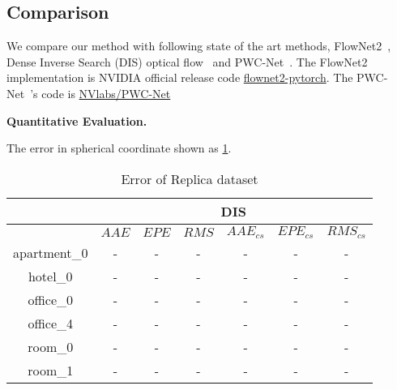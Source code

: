 \subsection{Comparison}

We compare our method with following state of the art methods, FlowNet2~\cite{IlgMSKDB2017}, Dense Inverse Search (DIS) optical flow~\cite{KroegTDV2016} and PWC-Net~\cite{SunYLK2018}. 
The FlowNet2~\cite{IlgMSKDB2017} implementation is NVIDIA official release code \href{https://github.com/NVIDIA/flownet2-pytorch}{flownet2-pytorch}.
The PWC-Net~\cite{SunYLK2018}'s code is \href{https://github.com/NVlabs/PWC-Net}{NVlabs/PWC-Net}


\textbf{Quantitative Evaluation.}


The error in spherical coordinate shown as \cref{fig:exp:quality}.



\begin{table}[h!]
	\centering
	\begin{tabular}{ c | c | c | c | c | c | c }
		\hline
		& \multicolumn{6}{c}{DIS}  \\
		\hline
		& ${AAE}$ & ${EPE}$ & ${RMS}$ & ${AAE_{cs}}$ & ${EPE_{cs}}$ & ${RMS_{cs}}$ \\
		\hline
		apartment\_0 & - & - & -  & - & - & -  \\ 
		\hline
		hotel\_0 & - & - & -  & - & - & -  \\ 
		\hline
		office\_0 & - & - & - & - & - & -  \\ 
		\hline
		office\_4 & - & - & -  & - & - & -  \\ 
		\hline
		room\_0 & - & - & - & - & - & -  \\ 
		\hline
		room\_1 & - & - & -  & - & - & -  \\ 
		\hline\hline
	\end{tabular}
	\caption{Error of Replica dataset}
	\label{fig:exp:quality}
\end{table}


